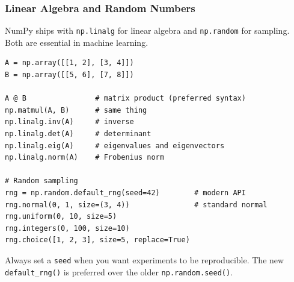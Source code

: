 \documentclass[aspectratio=169,10pt]{beamer}
\newcommand{\codeword}[1]{\texttt{#1}}
\begin{document}
\begin{frame}[fragile]
\frametitle{Linear Algebra and Random Numbers}
\small
NumPy ships with \codeword{np.linalg} for linear algebra and \codeword{np.random} for sampling. Both are essential in machine learning.

\vspace{0.12cm}
\begin{lstlisting}[style=pycode]
A = np.array([[1, 2], [3, 4]])
B = np.array([[5, 6], [7, 8]])

A @ B                # matrix product (preferred syntax)
np.matmul(A, B)      # same thing
np.linalg.inv(A)     # inverse
np.linalg.det(A)     # determinant
np.linalg.eig(A)     # eigenvalues and eigenvectors
np.linalg.norm(A)    # Frobenius norm

# Random sampling
rng = np.random.default_rng(seed=42)        # modern API
rng.normal(0, 1, size=(3, 4))               # standard normal
rng.uniform(0, 10, size=5)
rng.integers(0, 100, size=10)
rng.choice([1, 2, 3], size=5, replace=True)
\end{lstlisting}

\begin{tcolorbox}[lecturebox,title=Reproducibility]
Always set a \codeword{seed} when you want experiments to be reproducible. The new \codeword{default\_rng()} is preferred over the older \codeword{np.random.seed()}.
\end{tcolorbox}
\end{frame}
\end{document}

